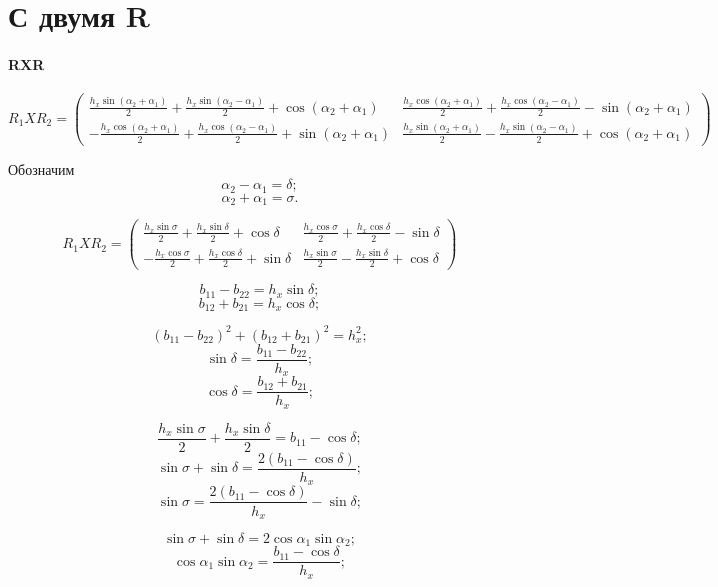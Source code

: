 \section{С двумя R}

\paragraph{RXR}

$$R_1XR_2 = 
\begin{pmatrix}
 \frac{{h_x}\sin{\left( {\alpha_2}+{\alpha_1}\right) } }{2}+\frac{{h_x}\sin{\left( {\alpha_2}-{\alpha_1}\right) } }{2}+\cos{\left( {\alpha_2}+{\alpha_1}\right) } & 
 \frac{{h_x}\cos{\left( {\alpha_2}+{\alpha_1}\right) } }{2}+\frac{{h_x}\cos{\left( {\alpha_2}-{\alpha_1}\right) } }{2}-\sin{\left( {\alpha_2}+{\alpha_1}\right) } \\
-\frac{{h_x}\cos{\left( {\alpha_2}+{\alpha_1}\right) } }{2}+\frac{{h_x}\cos{\left( {\alpha_2}-{\alpha_1}\right) } }{2}+\sin{\left( {\alpha_2}+{\alpha_1}\right) } & 
 \frac{{h_x}\sin{\left( {\alpha_2}+{\alpha_1}\right) } }{2}-\frac{{h_x}\sin{\left( {\alpha_2}-{\alpha_1}\right) } }{2}+\cos{\left( {\alpha_2}+{\alpha_1}\right) }
\end{pmatrix}
$$

Обозначим 
$$\alpha_2 - \alpha_1 = \delta;$$
$$\alpha_2 + \alpha_1 = \sigma.$$

$$R_1XR_2 = 
\begin{pmatrix}
 \frac{{h_x}\sin\sigma }{2}+\frac{{h_x}\sin\delta }{2}+\cos\delta & 
 \frac{{h_x}\cos\sigma }{2}+\frac{{h_x}\cos\delta }{2}-\sin\delta \\
-\frac{{h_x}\cos\sigma }{2}+\frac{{h_x}\cos\delta }{2}+\sin\delta & 
 \frac{{h_x}\sin\sigma }{2}-\frac{{h_x}\sin\delta }{2}+\cos\delta
\end{pmatrix}
$$

$$b_{11} - b_{22} = h_x \sin\delta;$$
$$b_{12} + b_{21} = h_x \cos\delta ;$$

$$\left(b_{11} - b_{22}\right)^2 + \left(b_{12} + b_{21}\right)^2 = h_x^2;$$
$$\sin\delta = \frac{b_{11} - b_{22}}{h_x};$$
$$\cos\delta = \frac{b_{12} + b_{21}}{h_x};$$

$$\frac{{h_x}\sin\sigma }{2} + \frac{{h_x}\sin\delta }{2} = b_{11} - \cos\delta;$$
$$\sin\sigma + \sin\delta = \frac{2 (b_{11} - \cos\delta)}{h_x};$$
$$\sin\sigma = \frac{2 (b_{11} - \cos\delta)}{h_x} - \sin\delta;$$

$$\sin\sigma + \sin\delta = 2 \cos\alpha_1 \sin\alpha_2;$$
$$\cos\alpha_1 \sin\alpha_2 = \frac{b_{11} - \cos\delta}{h_x};$$


